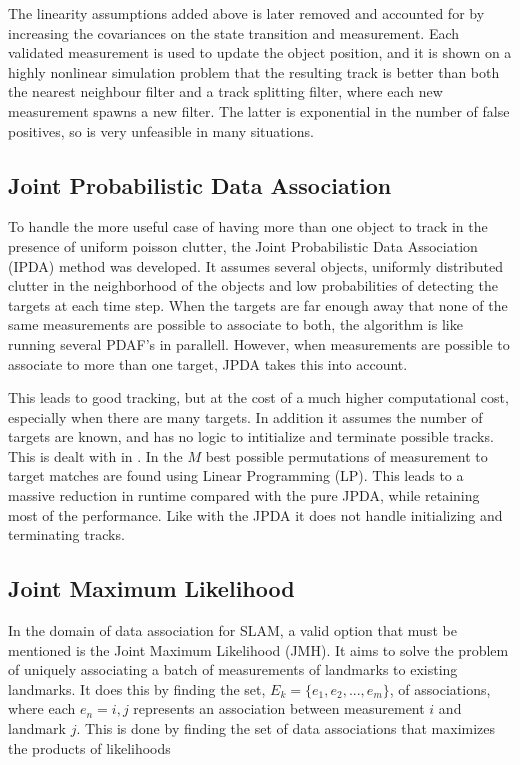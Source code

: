 The linearity assumptions added above is later removed and accounted for by increasing the covariances on the state transition and measurement. Each validated measurement is used to update the object position, and it is shown on a highly nonlinear simulation problem that the resulting track is better than both the nearest neighbour filter and a track splitting filter, where each new measurement spawns a new filter. The latter is exponential in the number of false positives, so is very unfeasible in many situations. 

\subsection{Joint Probabilistic Data Association}

To handle the more useful case of having more than one object to track in the presence of uniform poisson clutter, the Joint Probabilistic Data Association (IPDA) method was developed\cite{JPDA}. It assumes several objects, uniformly distributed clutter in the neighborhood of the objects and low probabilities of detecting the targets at each time step. When the targets are far enough away that none of the same measurements are possible to associate to both, the algorithm is like running several PDAF's in parallell. However, when measurements are possible to associate to more than one target, JPDA takes this into account. 

This leads to good tracking, but at the cost of a much higher computational cost, especially when there are many targets. In addition it assumes the number of targets are known, and has no logic to intitialize and terminate possible tracks. This is dealt with in \cite{Multitrack}. In \cite{JPDARev} the $M$ best possible permutations of measurement to target matches are found using Linear Programming (LP). This leads to a massive reduction in runtime compared with the pure JPDA, while retaining most of the performance. Like with the JPDA it does not handle initializing and terminating tracks. 

\subsection{Joint Maximum Likelihood}

In the domain of data association for SLAM, a valid option that must be mentioned is the Joint Maximum Likelihood (JMH)\cite{JMH}. It aims to solve the problem of uniquely associating a batch of measurements of landmarks to existing landmarks. It does this by finding the set, $E_k = \{ e_1, e_2, ... , e_m\} $, of associations, where each $e_n = {i,j}$ represents an association between measurement $i$ and landmark $j$. This is done by finding the set of data associations that maximizes the products of likelihoods

